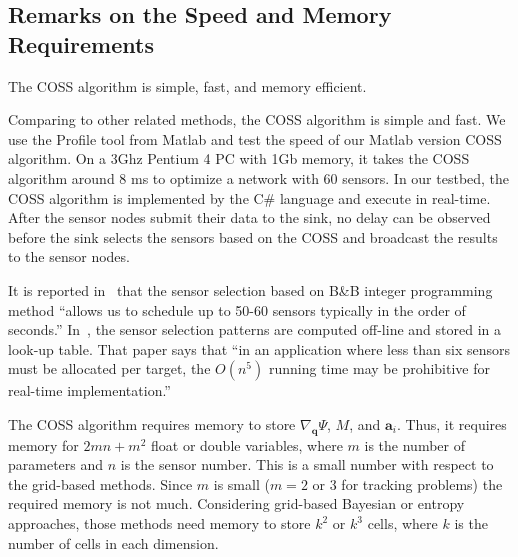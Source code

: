 \subsection{Remarks on the Speed and Memory Requirements}\label{s:remarks}
 The COSS algorithm is simple, fast, and memory efficient.

Comparing to other related methods, the COSS algorithm is simple and fast.
We use the Profile tool from Matlab and test the speed of our Matlab version COSS algorithm. On a 3Ghz Pentium 4 PC with 1Gb memory, it takes the COSS algorithm around 8 ms to optimize a network with 60 sensors. In our testbed, the COSS algorithm is implemented by the C\# language and execute in real-time. After the sensor nodes submit their data to the sink, no delay can be observed before the sink selects the sensors based on the COSS and broadcast the results to the sensor nodes.

    It is reported in~\cite{SAM2006Amit} that the sensor selection based on B\&B integer programming method ``allows us to schedule up to 50-60 sensors typically in the order of seconds.'' In~\cite{isler06tase}, the sensor selection patterns are computed off-line and stored in a look-up table. That paper says that ``in an application where less than six sensors must be allocated per target, the $O(n^5)$ running time may be prohibitive for real-time implementation.''






The COSS algorithm requires memory to store $\nabla_{\mathbf{q}} \Psi$, $M$, and $\mathbf{a}_i$. Thus, it requires memory for $2mn+m^2$ float or double variables, where $m$ is the number of parameters and $n$ is the sensor number. This is a small number with respect to the grid-based methods. Since $m$ is small ($m=2$ or 3 for tracking problems) the required memory is not much. %
    Considering grid-based Bayesian or entropy approaches, those methods need memory to store $k^2$ or $k^3$ cells, where $k$ is the number of cells in each dimension.



